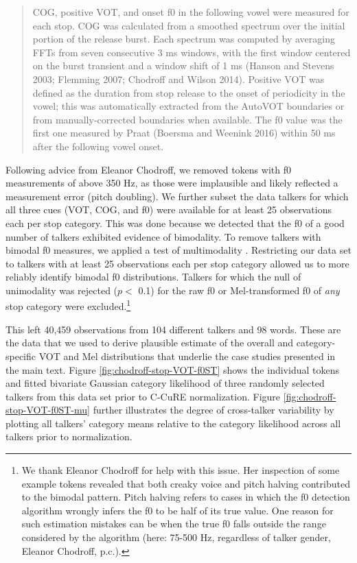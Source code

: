 \documentclass[
  11pt,
  man,floatsintext]{apa6}
\begin{document}
\begin{quote}
COG, positive VOT, and onset f0 in the following vowel were measured for each stop. COG was calculated
from a smoothed spectrum over the initial portion of the release burst. Each spectrum was computed by averaging
FFTs from seven consecutive 3 ms windows, with the first window centered on the burst transient and
a window shift of 1 ms (Hanson and Stevens 2003; Flemming 2007; Chodroff and Wilson 2014). Positive VOT
was defined as the duration from stop release to the onset of periodicity in the vowel; this was automatically
extracted from the AutoVOT boundaries or from manually-corrected boundaries when available. The
f0 value was the first one measured by Praat (Boersma and Weenink 2016) within 50 ms after the following
vowel onset.
\end{quote}

Following advice from Eleanor Chodroff, we removed tokens with f0 measurements of above 350 Hz, as those were implausible and likely reflected a measurement error (pitch doubling). We further subset the data talkers for which all three cues (VOT, COG, and f0) were available for at least 25 observations each per stop category. This was done because we detected that the f0 of a good number of talkers exhibited evidence of bimodality. To remove talkers with bimodal f0 measures, we applied a test of multimodality \autocite[the dip test, as implemented in the library \texttt{diptest} in \texttt{R},][]{maechler2021}. Restricting our data set to talkers with at least 25 observations each per stop category allowed us to more reliably identify bimodal f0 distributions. Talkers for which the null of unimodality was rejected (\(p<\) 0.1) for the raw f0 or Mel-transformed f0 of \emph{any} stop category were excluded.\footnote{We thank Eleanor Chodroff for help with this issue. Her inspection of some example tokens revealed that both creaky voice and pitch halving contributed to the bimodal pattern. Pitch halving refers to cases in which the f0 detection algorithm wrongly infers the f0 to be half of its true value. One reason for such estimation mistakes can be when the true f0 falls outside the range considered by the algorithm (here: 75-500 Hz, regardless of talker gender, Eleanor Chodroff, p.c.).}

This left 40,459 observations from 104 different talkers and 98 words. These are the data that we used to derive plausible estimate of the overall and category-specific VOT and Mel distributions that underlie the case studies presented in the main text. Figure \ref{fig:chodroff-stop-VOT-f0ST} shows the individual tokens and fitted bivariate Gaussian category likelihood of three randomly selected talkers from this data set prior to C-CuRE normalization. Figure \ref{fig:chodroff-stop-VOT-f0ST-mu} further illustrates the degree of cross-talker variability by plotting all talkers' category means relative to the category likelihood across all talkers prior to normalization.
\end{document}
